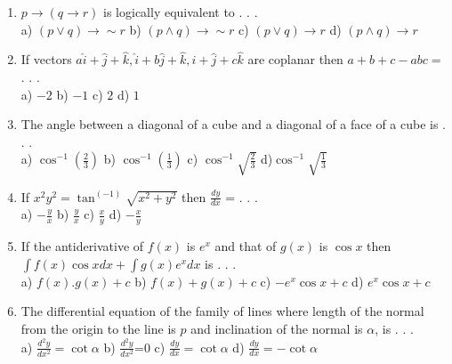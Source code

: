 \documentclass[12pt,a4paper]{article}
\begin{document}
\begin{enumerate}
\item $ p\rightarrow (q \rightarrow r) $ is logically equivalent to . . . \doublespacing \\
a) $ (p\vee q)\rightarrow \sim r $ \hspace{1cm} 
b) $ (p\wedge q)\rightarrow \sim r $ \hspace{1cm} 
c) $ (p\vee q)\rightarrow r $ \hspace{1cm}
d) $ (p\wedge q)\rightarrow r $  
\item If vectors $ a\hat{i}+\hat{j}+\hat{k}, \hat{i}+b\hat{j}+\hat{k}, \hat{i}+\hat{j}+c\hat{k} $ are coplanar then $ a+b+c-abc= $ . . .\\
a) $ -2 $ \hspace{1cm} 
b) $ -1 $ \hspace{1cm} 
c) $ 2 $ \hspace{1cm}
d)   $ 1 $
\item The angle between a diagonal of a cube and a diagonal of a face of a cube is . . . \\
a) $ \cos^{-1}(\frac{2}{3}) $ \hspace{1cm} 
b) $ \cos^{-1}(\frac{1}{3}) $ \hspace{1cm} 
c) $ \cos^{-1}\sqrt{\frac{2}{3}} $ \hspace{1cm}
d)$ \cos^{-1}\sqrt{\frac{1}{3}} $   
\item If $ x^2y^2=\tan^(-1){\sqrt{x^2+y^2}} $ then $ \frac{dy}{dx} $ = . . .\\  
a) $ -\frac{y}{x} $ \hspace{1cm} 
b)  $  \frac{y}{x} $\hspace{1cm} 
c)   $\frac{x}{y} $\hspace{1cm}
d)    $-\frac{x}{y} $
\item If the antiderivative of $ f(x)  $ is $ e^x $ and that of $ g(x) $ is $ \cos x $ then $ \int f(x) \cos x dx + \int g(x) e^x dx$ is . . . \\
a) $ f(x).g(x)+c $ \hspace{1cm} 
b)  $ f(x)+g(x) +c$\hspace{1cm} 
c) $ -e^x \cos x +c$ \hspace{1cm}
d) $ e^x \cos x +c$  
\item The differential equation of the family of lines where length of the normal from the origin to the line is $ p $ and inclination of the normal is $ \alpha $, is . . .\\
a) $ \frac {d^2y}{dx^2}= \cot \alpha $ \hspace{1cm} 
b) $ \frac {d^2y}{dx^2} $=0 \hspace{1cm} 
c) $ \frac {dy}{dx}= \cot \alpha $ \hspace{1cm}
d)   $ \frac {dy}{dx}= -\cot \alpha $ 


\end{enumerate}
\end{document}
